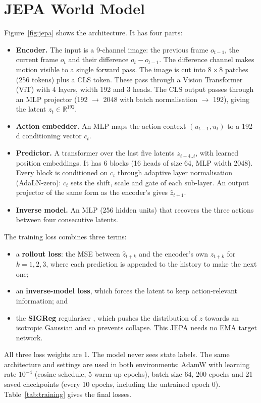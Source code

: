 \documentclass[11pt, a4paper, oneside,enumerate,textcomp]{report}
\newcommand{\zh}{\hat{z}}
\begin{document}
\section{JEPA World Model}

Figure~\ref{fig:jepa} shows the architecture. It has four parts:
\begin{itemize}
	\item \textbf{Encoder.} The input is a 9-channel image: the previous frame $o_{t-1}$, the current frame $o_t$ and their difference $o_t - o_{t-1}$. The difference channel makes motion visible to a single forward pass. The image is cut into $8\times8$ patches (256 tokens) plus a CLS token. These pass through a Vision Transformer (ViT) with 4 layers, width 192 and 3 heads. The CLS output passes through an MLP projector (192 $\to$ 2048 with batch normalisation $\to$ 192), giving the latent $z_t \in \mathbb{R}^{192}$.
	\item \textbf{Action embedder.} An MLP maps the action context $(u_{t-1}, u_t)$ to a 192-d conditioning vector $c_t$.
	\item \textbf{Predictor.} A transformer over the last five latents $z_{t-4..t}$, with learned position embeddings. It has 6 blocks (16 heads of size 64, MLP width 2048). Every block is conditioned on $c_t$ through adaptive layer normalisation (AdaLN-zero): $c_t$ sets the shift, scale and gate of each sub-layer. An output projector of the same form as the encoder's gives $\zh_{t+1}$.
	\item \textbf{Inverse model.} An MLP (256 hidden units) that recovers the three actions between four consecutive latents.
\end{itemize}
The training loss combines three terms:
\begin{itemize}
	\item a \textbf{rollout loss}: the MSE between $\zh_{t+k}$ and the encoder's own $z_{t+k}$ for $k = 1, 2, 3$, where each prediction is appended to the history to make the next one;
	\item an \textbf{inverse-model loss}, which forces the latent to keep action-relevant information; and
	\item the \textbf{SIGReg} regulariser \cite{balestriero2025lejepa}, which pushes the distribution of $z$ towards an isotropic Gaussian and so prevents collapse. This JEPA needs no EMA target network.
\end{itemize}
All three loss weights are 1. The model never sees state labels. The same architecture and settings are used in both environments: AdamW with learning rate $10^{-4}$ (cosine schedule, 5 warm-up epochs), batch size 64, 200 epochs and 21 saved checkpoints (every 10 epochs, including the untrained epoch 0). Table~\ref{tab:training} gives the final losses.
\end{document}
